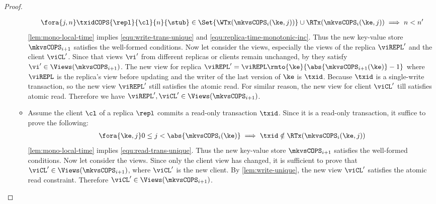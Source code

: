 \begin{proof}
\begin{itemize}
\begin{itemize}
\begin{gather}
                    \fora{j, n} \txidCOPS{\repl}{\cl}{n}{\stub} \in \Set{\WTx(\mkvsCOPS_{i}(\ke,j))} \cup \RTx(\mkvsCOPS_{i}(\ke, j)) \implies n < n' \label{equ:replica-time-monotonic-inc}
                \end{gather}
                \cref{lem:mono-local-time} implies \cref{equ:write-trans-unique} and \cref{equ:replica-time-monotonic-inc}.
                Thus the new key-value store \( \mkvsCOPS_{i+1} \) satisfies the well-formed conditions.
                Now let consider the views, especially the views of the replica \( \viREPL' \) and the client \( \viCL' \).
                Since that views \( \vi' \) from different replicas or clients remain unchanged, by \ih they satisfy \( \vi' \in \Views(\mkvsCOPS_{i+1}) \).
                The new view for replica \( \viREPL' = \viREPL\rmto{\ke}{\abs{\mkvsCOPS_{i+1}(\ke)} - 1} \)
                where \( \viREPL \) is the replica's view before updating and the writer of the last version of \( \ke \) is \( \txid \).
                Because \( \txid \) is a single-write transaction, so the new view \( \viREPL' \) still satisfies the atomic read.
                For similar reason, the new view for client \( \viCL' \) till satisfies atomic read.
                Therefore we have \( \viREPL', \viCL' \in \Views(\mkvsCOPS_{i+1}) \).

            \item {}
                Assume the client \( \cl \) of a replica \( \repl \) commits a read-only transaction \( \txid \).
                Since it is a read-only transaction, it suffice  to prove the following:
                \begin{gather}
                    \fora{\ke,j} 0 \leq j < \abs{ \mkvsCOPS_i(\ke) } \implies \txid \notin \RTx(\mkvsCOPS_{i}(\ke, j)) \label{equ:read-trans-unique} 
                \end{gather}
                \cref{lem:mono-local-time} implies \cref{equ:read-trans-unique}.
                Thus the new key-value store \( \mkvsCOPS_{i+1} \) satisfies the well-formed conditions.
                Now let consider the views.
                Since only the client view has changed, it is sufficient to  prove that \( \viCL' \in \Views(\mkvsCOPS_{i+1}) \), 
                where \( \viCL' \) is the new client.
                By \cref{lem:write-unique}, the new view \( \viCL' \) satisfies the atomic read constraint.
                Therefore \( \viCL' \in \Views(\mkvsCOPS_{i+1})  \).
        \end{itemize}
    \end{itemize}
\end{proof}

